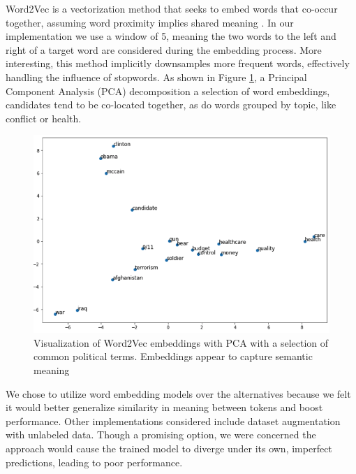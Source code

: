 \documentclass[11pt,a4paper]{article}
\begin{document}
Word2Vec \cite{mikolov2013distributed} is a vectorization method that seeks to embed words that co-occur together, assuming word proximity implies shared meaning \cite{lilleberg2015support}. In our implementation we use a window of 5, meaning the two words to the left and right of a target word are considered during the embedding process. More interesting, this method implicitly downsamples more frequent words, effectively handling the influence of stopwords. As shown in Figure \ref{fig:imgs/w2v_pca}, a Principal Component Analysis (PCA) decomposition a selection of word embeddings, candidates tend to be co-located together, as do words grouped by topic, like conflict or health. 


\begin{figure}[htpb]
  \centering
  \includegraphics[width=1\linewidth]{imgs/w2v_pca.png}
  \caption{Visualization of Word2Vec embeddings with PCA with a selection 
  of common political terms. Embeddings appear to capture semantic meaning}%
  \label{fig:imgs/w2v_pca}
  \vspace{-8pt}
\end{figure}


We chose to utilize word embedding models over the alternatives because we felt it would better generalize similarity in meaning between tokens and boost performance. Other implementations considered include dataset augmentation with unlabeled data. Though a promising option, we were concerned the approach would cause the trained model to diverge under its own, imperfect predictions, leading to poor performance. 
\end{document}
